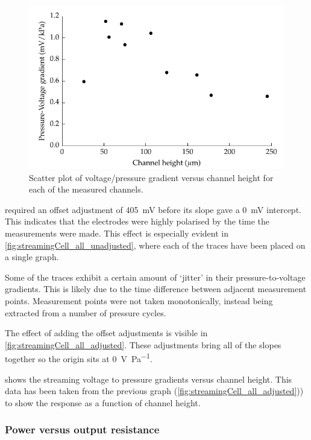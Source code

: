 \begin{figure}
    \centering
    \includegraphics{content/pt1/01-PowerHarvesting/graphics/streamingCell_slopeVsChannelHeight}
    \caption{\label{fig:streamingCell_scatter_voltGradVsHeight}Scatter plot of voltage/pressure gradient versus channel height for each of the measured channels.}
\end{figure}

 required an offset adjustment of \SI{405}{\milli\volt} before its slope gave a \SI{0}{\milli\volt} intercept.
This indicates that the electrodes were highly polarised by the time the measurements were made.
This effect is especially evident in \cref{fig:streamingCell_all_unadjusted}, where each of the traces have been placed on a single graph.

Some of the traces exhibit a certain amount of `jitter' in their pressure-to-voltage gradients.
This is likely due to the time difference between adjacent measurement points.
Measurement points were not taken monotonically, instead being extracted from a number of pressure cycles.

The effect of adding the offset adjustments is visible in \cref{fig:streamingCell_all_adjusted}.
These adjustments bring all of the slopes together so the origin sits at \SI{0}{\volt\per\pascal}.

 shows the streaming voltage to pressure gradients versus channel height.
This data has been taken from the previous graph (\cref{fig:streamingCell_all_adjusted})) to show the response as a function of channel height.

\subsubsection*{Power versus output resistance}

